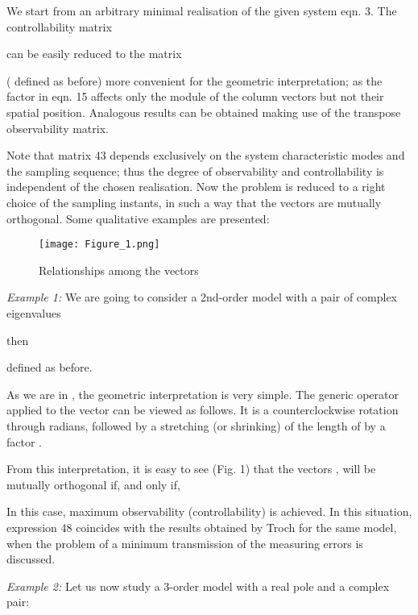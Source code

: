 \documentclass{article}
\begin{document}
We start from
an arbitrary minimal realisation  of the given system
eqn. 3. The controllability matrix



can be easily reduced to the matrix




( defined as before) more convenient for the
geometric interpretation; as the factor  in
eqn. 15 affects only the module of the column vectors but not
their spatial position. Analogous results can be obtained making
use of the transpose observability matrix.

Note that matrix 43 depends exclusively on the system
characteristic modes and the sampling sequence; thus the degree of
observability and controllability is independent of the chosen
realisation. Now the problem is reduced to a right choice of the
sampling instants, in such a way that the vectors  are
mutually orthogonal. Some qualitative examples are presented:

\begin{figure}
\begin{center}
\texttt{[image: Figure\_1.png]}
\caption{Relationships among the vectors }
\label{figure:headings1}
\end{center}
\end{figure}

\textit{Example 1:} We are going to
consider a 2nd-order model with a pair of complex eigenvalues

then




 defined as before.

As we are in , the geometric
interpretation is very simple. The generic operator 
applied to the vector  can be viewed as follows. It is a
counterclockwise rotation through  radians, followed by a
stretching (or shrinking) of the length of  by a factor  \cite{Hirsch}.

From this interpretation, it is easy to see (Fig. 1) that the vectors
, will be mutually orthogonal if, and only if,



In this case, maximum observability (controllability) is achieved.
In this situation, expression 48 coincides with the results
obtained by Troch \cite{Troch} for the same model, when the
problem of a minimum transmission of the measuring errors is
discussed.

\textit{Example 2:} Let us now study a
3-order model with a real pole and a complex pair:
\end{document}
